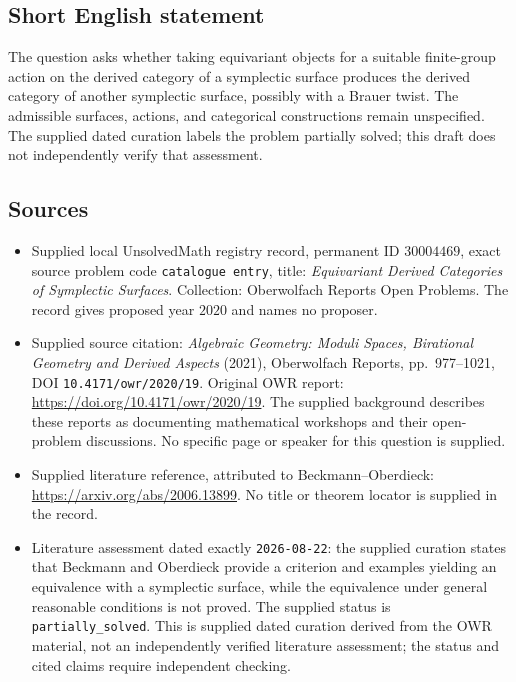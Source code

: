 \documentclass[11pt]{article}
\begin{document}
\subsection{Short English statement}
The question asks whether taking equivariant objects for a suitable finite-group action on the derived category of a symplectic surface produces the derived category of another symplectic surface, possibly with a Brauer twist. The admissible surfaces, actions, and categorical constructions remain unspecified. The supplied dated curation labels the problem partially solved; this draft does not independently verify that assessment.
\subsection{Sources}
\begin{itemize}
\item Supplied local UnsolvedMath registry record, permanent ID \(30004469\), exact source problem code \texttt{catalogue entry}, title: \emph{Equivariant Derived Categories of Symplectic Surfaces}. Collection: Oberwolfach Reports Open Problems. The record gives proposed year \(2020\) and names no proposer.
\item Supplied source citation: \emph{Algebraic Geometry: Moduli Spaces, Birational Geometry and Derived Aspects} (2021), Oberwolfach Reports, pp.~977--1021, DOI \texttt{10.4171/owr/2020/19}. Original OWR report: \url{https://doi.org/10.4171/owr/2020/19}. The supplied background describes these reports as documenting mathematical workshops and their open-problem discussions. No specific page or speaker for this question is supplied.
\item Supplied literature reference, attributed to Beckmann--Oberdieck: \url{https://arxiv.org/abs/2006.13899}. No title or theorem locator is supplied in the record.
\item Literature assessment dated exactly \texttt{2026-08-22}: the supplied curation states that Beckmann and Oberdieck provide a criterion and examples yielding an equivalence with a symplectic surface, while the equivalence under general reasonable conditions is not proved. The supplied status is \texttt{partially\_solved}. This is supplied dated curation derived from the OWR material, not an independently verified literature assessment; the status and cited claims require independent checking.
\end{itemize}
\end{document}
